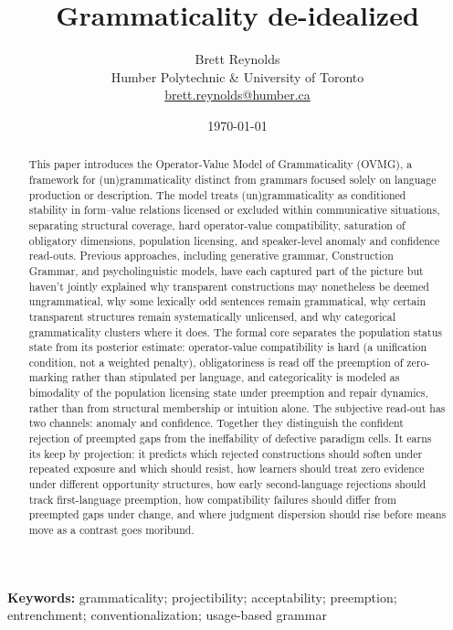 \documentclass[12pt,letterpaper]{article}
\title{Grammaticality de-idealized}
\author{Brett Reynolds \orcidlink{0000-0003-0073-7195}\\
  Humber Polytechnic \& University of Toronto\\
  \href{mailto:brett.reynolds@humber.ca}{brett.reynolds@humber.ca}}
\date{\today}
\begin{document}
\maketitle

\begin{abstract}
    This paper introduces the Operator-Value Model of Grammaticality (OVMG), a framework for (un)gram\-maticality distinct from grammars focused solely on language production or description. The model treats (un)grammaticality as conditioned stability in form--value relations licensed or excluded within communicative situations, separating structural coverage, hard operator-value compatibility, saturation of obligatory dimensions, population licensing, and speaker-level anomaly and confidence read-outs. Previous approaches, including generative grammar, Construction Grammar, and psycholinguistic models, have each captured part of the picture but haven't jointly explained why transparent constructions may nonetheless be deemed ungrammatical, why some lexically odd sentences remain grammatical, why certain transparent structures remain systematically unlicensed, and why categorical grammaticality clusters where it does. The formal core separates the population status state from its posterior estimate: operator-value compatibility is hard (a unification condition, not a weighted penalty), obligatoriness is read off the preemption of zero-marking rather than stipulated per language, and categoricality is modeled as bimodality of the population licensing state under preemption and repair dynamics, rather than from structural membership or intuition alone. The subjective read-out has two channels: anomaly and confidence. Together they distinguish the confident rejection of preempted gaps from the ineffability of defective paradigm cells. It earns its keep by projection: it predicts which rejected constructions should soften under repeated exposure and which should resist, how learners should treat zero evidence under different opportunity structures, how early second-language rejections should track first-language preemption, how compatibility failures should differ from preempted gaps under change, and where judgment dispersion should rise before means move as a contrast goes moribund.
\end{abstract}

\noindent\textbf{Keywords:} grammaticality; projectibility; acceptability; preemption; entrenchment; conventionalization; usage-based grammar

\end{document}
